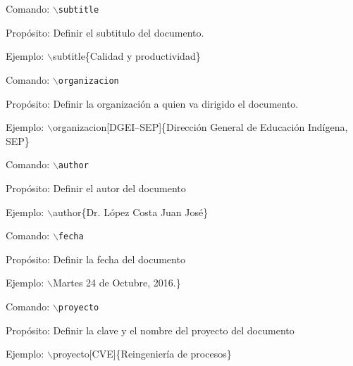 \begin{Cdescription}
	\item[Comando:] {\tt $\backslash$subtitle}
	\item[Propósito:] Definir el subtitulo del documento.
	\item[Ejemplo:]$\backslash$subtitle\{Calidad y productividad\}
\end{Cdescription}

\begin{Cdescription}
	\item[Comando:] {\tt $\backslash$organizacion}
	\item[Propósito:] Definir la organización a quien va dirigido el documento.
	\item[Ejemplo:] $\backslash$organizacion[DGEI--SEP]\{Dirección General de Educación Indígena, SEP\}
\end{Cdescription}

\begin{Cdescription}
	\item[Comando:] {\tt $\backslash$author}
	\item[Propósito:] Definir el autor del documento
	\item[Ejemplo:]$\backslash$author\{Dr. López Costa Juan José\}
\end{Cdescription}

\begin{Cdescription}
	\item[Comando:] {\tt $\backslash$fecha}
	\item[Propósito:] Definir la fecha del documento
	\item[Ejemplo:]$\backslash$Martes 24 de Octubre, 2016.\}
\end{Cdescription}


\begin{Cdescription}
	\item[Comando:] {\tt $\backslash$proyecto}
	\item[Propósito:] Definir la clave y el nombre del proyecto del documento
	\item[Ejemplo:] $\backslash$proyecto[CVE]\{Reingeniería de procesos\}
\end{Cdescription}

